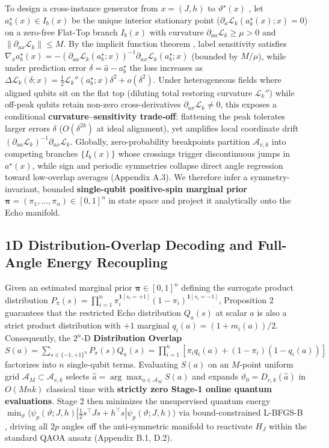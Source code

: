 \documentclass{article}
\theoremstyle{plain}
\theoremstyle{definition}
\begin{document}
To design a cross-instance generator from $x=(J,h)$ to $\vartheta^\star(x)$ \citep{amos2023tutorial,verdon2019learning}, let $a_b^\star(x)\in I_b(x)$ be the unique interior stationary point ($\partial_a\mathcal L_k(a_b^\star(x);x)=0$) on a zero-free Flat-Top branch $I_b(x)$ with curvature $\partial_{aa}\mathcal L_k\ge\mu>0$ and $\|\partial_{ax}\mathcal L_k\|\le M$. By the implicit function theorem \citep{amos2023tutorial,gould2021deep}, label sensitivity satisfies $\nabla_xa_b^\star(x)=-(\partial_{aa}\mathcal L_k(a_b^\star;x))^{-1}\partial_{ax}\mathcal L_k(a_b^\star;x)$ (bounded by $M/\mu$), while under prediction error $\delta=\widehat a-a_b^\star$ the loss increases as $\Delta\mathcal L_k(\delta;x)=\frac12\mathcal L_k''(a_b^\star;x)\delta^2+o(\delta^2)$. Under heterogeneous fields where aligned qubits sit on the flat top (diluting total restoring curvature $\mathcal L_k''$) while off-peak qubits retain non-zero cross-derivatives $\partial_{ax}\mathcal L_k\ne 0$, this exposes a conditional \textbf{curvature--sensitivity trade-off}: flattening the peak tolerates larger errors $\delta$ ($O(\delta^{2k})$ at ideal alignment), yet amplifies local coordinate drift $(\partial_{aa}\mathcal L_k)^{-1}\partial_{ax}\mathcal L_k$. Globally, zero-probability breakpoints partition $\mathcal A_{v,k}$ into competing branches $\{I_b(x)\}$ whose crossings trigger discontinuous jumps in $a^\star(x)$, while sign and periodic symmetries collapse direct angle regression toward low-overlap averages (Appendix A.3). We therefore infer a symmetry-invariant, bounded \textbf{single-qubit positive-spin marginal prior} $\boldsymbol{\pi}=(\pi_1,\ldots,\pi_n)\in[0,1]^n$ in state space and project it analytically onto the Echo manifold.

\subsection{1D Distribution-Overlap Decoding and Full-Angle Energy Recoupling}\label{subsec:4_2}

Given an estimated marginal prior $\boldsymbol{\pi}\in[0,1]^n$ defining the surrogate product distribution $P_{\pi}(s)=\prod_{i=1}^n\pi_i^{\mathbf1[s_i=+1]}(1-\pi_i)^{\mathbf1[s_i=-1]}$, Proposition 2 guarantees that the restricted Echo distribution $Q_a(s)$ at scalar $a$ is also a strict product distribution with $+1$ marginal $q_i(a)=(1+m_i(a))/2$. Consequently, the $2^n$-D \textbf{Distribution Overlap} $S(a)=\sum_{s\in\{-1,+1\}^n}P_{\pi}(s)Q_a(s)=\prod_{i=1}^n[\pi_iq_i(a)+(1-\pi_i)(1-q_i(a))]$ factorizes into $n$ single-qubit terms. Evaluating $S(a)$ on an $M$-point uniform grid $\mathcal A_M\subset\mathcal A_{v,k}$ selects $\widehat a=\arg\max_{a\in\mathcal A_M}S(a)$ and expands $\vartheta_0=D_{v,k}(\widehat a)$ in $O(Mnk)$ classical time with \textbf{strictly zero Stage-1 online quantum evaluations}. Stage 2 then minimizes the unsupervised quantum energy $\min_{\vartheta}\langle\psi_p(\vartheta;J,h)|\frac12s^\top Js+h^\top s|\psi_p(\vartheta;J,h)\rangle$ via bound-constrained L-BFGS-B \citep{byrd1995limited}, driving all $2p$ angles off the anti-symmetric manifold to reactivate $H_J$ within the standard QAOA ansatz (Appendix B.1, D.2).
\end{document}
